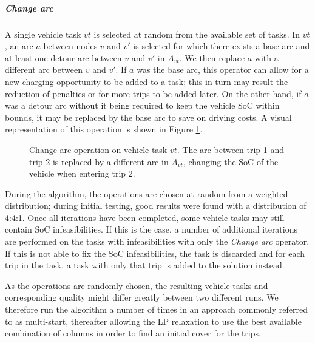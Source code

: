 \documentclass[]{article}
\begin{document}
\noindent\subparagraph{Change arc} A single vehicle task $vt$ is selected at random from the available set of tasks. In $vt$, an arc $a$ between nodes $v$ and $v'$ is selected for which there exists a base arc and at least one detour arc between $v$ and $v'$ in $A_{vt}$. We then replace $a$ with a different arc between $v$ and $v'$. If $a$ was the base arc, this operator can allow for a new charging opportunity to be added to a task; this in turn may result the reduction of penalties or for more trips to be added later. On the other hand, if $a$ was a detour arc without it being required to keep the vehicle SoC within bounds, it may be replaced by the base arc to save on driving costs. A visual representation of this operation is shown in Figure \ref{fig:changearc-vt}.
\begin{figure}[h]
  \centering
  \caption{Change arc operation on vehicle task $vt$. The arc between trip 1 and trip 2 is replaced by a different arc in $A_{vt}$, changing the SoC of the vehicle when entering trip 2.}
  \label{fig:changearc-vt}
\end{figure}

\noindent During the algorithm, the operations are chosen at random from a weighted distribution; during initial testing, good results were found with a distribution of 4:4:1. Once all iterations have been completed, some vehicle tasks may still contain SoC infeasibilities. If this is the case, a number of additional iterations are performed on the tasks with infeasibilities with only the \textit{Change arc} operator. If this is not able to fix the SoC infeasibilities, the task is discarded and for each trip in the task, a task with only that trip is added to the solution instead.

As the operations are randomly chosen, the resulting vehicle tasks and corresponding quality might differ greatly between two different runs. We therefore run the algorithm a number of times in an approach commonly referred to as multi-start, thereafter allowing the LP relaxation to use the best available combination of columns in order to find an initial cover for the trips. 
\end{document}
